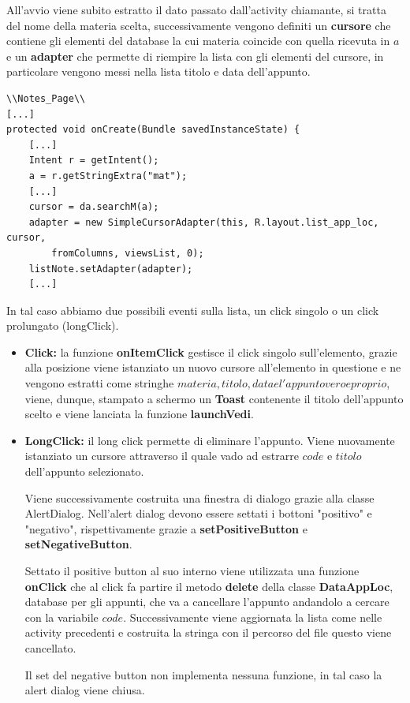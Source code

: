 \documentclass[a4paper, 50pt, twoside]{article}
\begin{document}
All'avvio viene subito estratto il dato passato dall'activity chiamante, si tratta del nome della materia scelta, successivamente vengono definiti un \textbf{cursore} che contiene gli elementi del database la cui materia coincide con quella ricevuta in $a$ e un \textbf{adapter} che permette di riempire la lista con gli elementi del cursore, in particolare vengono messi nella lista titolo e data dell'appunto.

\begin{lstlisting}
\\Notes_Page\\
[...]
protected void onCreate(Bundle savedInstanceState) {
	[...]
	Intent r = getIntent();
	a = r.getStringExtra("mat");
	[...]
	cursor = da.searchM(a);
	adapter = new SimpleCursorAdapter(this, R.layout.list_app_loc, cursor,
		fromColumns, viewsList, 0);
	listNote.setAdapter(adapter);
	[...]
\end{lstlisting}

In tal caso abbiamo due possibili eventi sulla lista, un click singolo o un click prolungato (longClick).
\begin{itemize}
\item \textbf{Click:} la funzione \textbf{onItemClick} gestisce il click singolo sull'elemento, grazie alla posizione viene istanziato un nuovo cursore all'elemento in questione e ne vengono estratti come stringhe $materia, titolo, data e l'appunto vero e proprio$, viene, dunque, stampato a schermo un \textbf{Toast} contenente il titolo dell'appunto scelto e viene lanciata la funzione \textbf{launchVedi}.
\item \textbf{LongClick:} il long click permette di eliminare l'appunto. Viene nuovamente istanziato un cursore attraverso il quale vado ad estrarre $code$ e $titolo$ dell'appunto selezionato.

Viene successivamente costruita una finestra di dialogo grazie alla classe AlertDialog. Nell'alert dialog devono essere settati i bottoni "positivo" e "negativo", rispettivamente grazie a \textbf{setPositiveButton} e \textbf{setNegativeButton}.

Settato il positive button al suo interno viene utilizzata una funzione \textbf{onClick} che al click fa partire il metodo \textbf{delete} della classe \textbf{DataAppLoc}, database per gli appunti, che va a cancellare l'appunto andandolo a cercare con la variabile $code$. Successivamente viene aggiornata la lista come nelle activity precedenti e costruita la stringa con il percorso del file questo viene cancellato.

Il set del negative button non implementa nessuna funzione, in tal caso la alert dialog viene chiusa.
\end{itemize}
\end{document}
